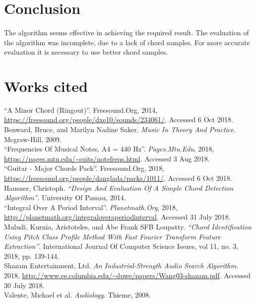 \documentclass{article}
\begin{document}
\section{Conclusion}
\paragraph*{}
The algorithm seems effective in achieving the required result. The evaluation 
of the algorithm was incomplete, due to a lack of chord samples. For more 
accurate evaluation it is necessary to use better chord samples.

\clearpage
\pagebreak
\section*{Works cited}
\begin{hangparas}{.25in}{1}

``A Minor Chord (Ringout)''. Freesound.Org, 2014, 
\url{https://freesound.org/people/dxe10/sounds/234061/}. Accessed 6 Oct 2018. \\

Benward, Bruce, and Marilyn Nadine Saker. 
\textit{Music In Theory And Practice}. Mcgraw-Hill, 2009. \\

``Frequencies Of Musical Notes, A4 = 440 Hz''. \textit{Pages.Mtu.Edu}, 2018, 
\url{https://pages.mtu.edu/~suits/notefreqs.html}. Accessed 3 Aug 2018. \\

``Guitar - Major Chords Pack''. Freesound.Org, 2018, 
\url{https://freesound.org/people/danglada/packs/1011/}. Accessed 6 Oct 2018. \\

Hausner, Christoph. \textit{``Design And Evaluation Of A Simple Chord 
Detection Algorithm''}. University Of Passau, 2014. \\

``Integral Over A Period Interval''. \textit{Planetmath.Org}, 2018, 
\url{http://planetmath.org/integraloveraperiodinterval}. Accessed 31 July 2018.
\\

Muludi, Kurnia, Aristoteles, and Abe Frank SFB Loupatty. \textit{``Chord 
Identification Using Pitch Class Profile Method With Fast Fourier Transform 
Feature Extraction''}. International Journal Of Computer Science Issues, vol 
11, no. 3, 2018, pp. 139-144. \\

Shazam Entertainment, Ltd. \textit{An Industrial-Strength Audio Search 
Algorithm}. 2018, 
\url{http://www.ee.columbia.edu/~dpwe/papers/Wang03-shazam.pdf}. 
Accessed 30 July 2018. \\

Valente, Michael et al. \textit{Audiology}. Thieme, 2008. \\

\end{hangparas}
\end{document}
